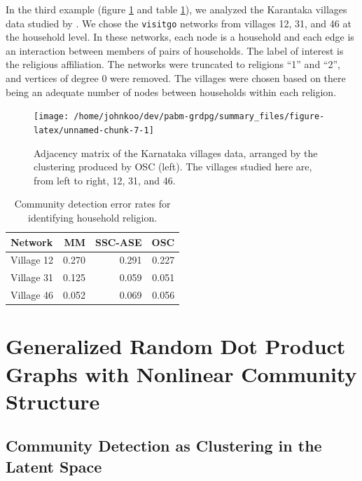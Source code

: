 \documentclass[
  11pt,
]{article}
\theoremstyle{definition}
\theoremstyle{definition}
\theoremstyle{definition}
\theoremstyle{definition}
\theoremstyle{remark}
\begin{document}
In the third example (figure \ref{fig:households-figure} and
table \ref{tab:households-table}),
we analyzed the Karantaka villages data studied by
\citet{DVN/U3BIHX_2013}. We chose the \texttt{visitgo}
networks from villages 12, 31, and 46 at the household level.
In these networks, each node is a household and each edge is
an interaction between members of pairs of households.
The label of interest is the religious affiliation.
The networks were truncated to religions ``1'' and ``2'',
and vertices of degree 0 were removed.
The villages were chosen based on there being an adequate number of nodes
between households within each religion.

\begin{figure}[H]
{\centering \texttt{[image: /home/johnkoo/dev/pabm-grdpg/summary\_files/figure-latex/unnamed-chunk-7-1]}
}
\caption{Adjacency matrix of the Karnataka villages data, arranged by the clustering produced by OSC (left). The villages studied here are, from left to right, 12, 31, and 46.}\label{fig:households-figure}
\end{figure}

\begin{table}[H]
\centering
\begin{tabular}[t]{l|r|r|r}
\hline
Network & MM & SSC-ASE & OSC\\
\hline
Village 12 & 0.270 & 0.291 & 0.227\\
\hline
Village 31 & 0.125 & 0.059 & 0.051\\
\hline
Village 46 & 0.052 & 0.069 & 0.056\\
\hline
\end{tabular}
\caption{\label{tab:households-table}Community detection error rates for identifying household religion.}
\end{table}

\newpage

\hypertarget{sec:mbm}{%
\section{Generalized Random Dot Product Graphs with Nonlinear Community Structure}\label{sec:mbm}}

\hypertarget{community-detection-as-clustering-in-the-latent-space}{%
\subsection{Community Detection as Clustering in the Latent Space}\label{community-detection-as-clustering-in-the-latent-space}}
\end{document}
